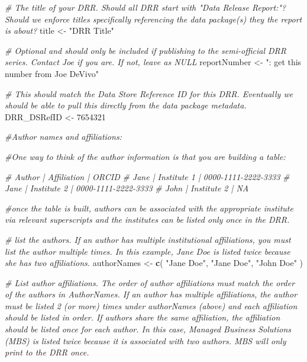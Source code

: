 \documentclass[
]{article}
\newenvironment{Shaded}{\begin{snugshade}}{\end{snugshade}}
\newcommand{\CommentTok}[1]{\textcolor[rgb]{0.56,0.35,0.01}{\textit{#1}}}
\newcommand{\DecValTok}[1]{\textcolor[rgb]{0.00,0.00,0.81}{#1}}
\newcommand{\FunctionTok}[1]{\textcolor[rgb]{0.13,0.29,0.53}{\textbf{#1}}}
\newcommand{\NormalTok}[1]{#1}
\newcommand{\OtherTok}[1]{\textcolor[rgb]{0.56,0.35,0.01}{#1}}
\newcommand{\StringTok}[1]{\textcolor[rgb]{0.31,0.60,0.02}{#1}}
\begin{document}
\begin{Shaded}
\begin{Highlighting}[]
\CommentTok{\# The title of your DRR. Should all DRR start with "Data Release Report:"? Should we enforce titles specifically referencing the data package(s) they the report is about?}
\NormalTok{title }\OtherTok{\textless{}{-}} \StringTok{"DRR Title"}

\CommentTok{\# Optional and should only be included if publishing to the semi{-}official DRR series. Contact Joe if you are. If not, leave as NULL}
\NormalTok{reportNumber }\OtherTok{\textless{}{-}} \StringTok{": get this number from Joe DeVivo"}

\CommentTok{\# This should match the Data Store Reference ID for this DRR. Eventually we should be able to pull this directly from the data package metadata.}
\NormalTok{DRR\_DSRefID }\OtherTok{\textless{}{-}} \DecValTok{7654321}

\CommentTok{\#Author names and affiliations:}

\CommentTok{\#One way to think of the author information is that you are building a table:}

\CommentTok{\# Author | Affiliation | ORCID}
\CommentTok{\# Jane   | Institute 1 | 0000{-}1111{-}2222{-}3333}
\CommentTok{\# Jane   | Institute 2 | 0000{-}1111{-}2222{-}3333}
\CommentTok{\# John   | Institute 2 | NA}

\CommentTok{\#once the table is built, authors can be associated with the appropriate institute via relevant superscripts and the institutes can be listed only once in the DRR.}

\CommentTok{\# list the authors. If an author has multiple institutional affiliations, you must list the author multiple times. In this example, Jane Doe is listed twice because she has two affiliations.}
\NormalTok{authorNames }\OtherTok{\textless{}{-}} \FunctionTok{c}\NormalTok{(}
  \StringTok{"Jane Doe"}\NormalTok{,}
  \StringTok{"Jane Doe"}\NormalTok{,}
  \StringTok{"John Doe"}
\NormalTok{)}

\CommentTok{\# List author affiliations. The order of author affiliations must match the order of the authors in AuthorNames. If an author has multiple affiliations, the author must be listed 2 (or more) times under authorNames (above) and each affiliation should be listed in order. If authors share the same affiliation, the affiliation should be listed once for each author. In this case, Managed Business Solutions (MBS) is listed twice because it is associated with two authors. MBS will only print to the DRR once.}


\end{Highlighting}
\end{Shaded}
\end{document}
